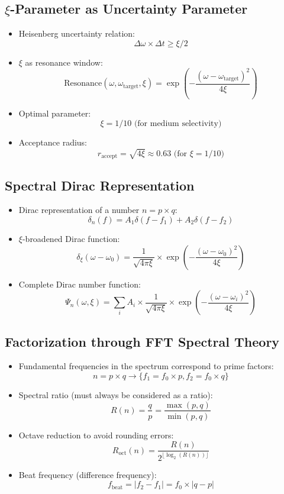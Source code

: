 \documentclass[12pt,a4paper]{article}
\begin{document}
	\subsection{$\xi$-Parameter as Uncertainty Parameter}
	\begin{itemize}
		\item Heisenberg uncertainty relation:
		$$\Delta\omega \times \Delta t \geq \xi/2$$
		
		\item $\xi$ as resonance window:
		$$\text{Resonance}(\omega, \omega_{\text{target}}, \xi) = \exp\left(-\frac{(\omega-\omega_{\text{target}})^2}{4\xi}\right)$$
		
		\item Optimal parameter:
		$$\xi = 1/10 \text{ (for medium selectivity)}$$
		
		\item Acceptance radius:
		$$r_{\text{accept}} = \sqrt{4\xi} \approx 0.63 \text{ (for } \xi = 1/10)$$
	\end{itemize}
	
	\subsection{Spectral Dirac Representation}
	\begin{itemize}
		\item Dirac representation of a number $n = p \times q$:
		$$\delta_n(f) = A_1\delta(f - f_1) + A_2\delta(f - f_2)$$
		
		\item $\xi$-broadened Dirac function:
		$$\delta_\xi(\omega - \omega_0) = \frac{1}{\sqrt{4\pi\xi}} \times \exp\left(-\frac{(\omega-\omega_0)^2}{4\xi}\right)$$
		
		\item Complete Dirac number function:
		$$\Psi_n(\omega,\xi) = \sum_i A_i \times \frac{1}{\sqrt{4\pi\xi}} \times \exp\left(-\frac{(\omega-\omega_i)^2}{4\xi}\right)$$
	\end{itemize}
	
	\subsection{Factorization through FFT Spectral Theory}
	\begin{itemize}
		\item Fundamental frequencies in the spectrum correspond to prime factors:
		$$n = p \times q \rightarrow \{f_1 = f_0 \times p, f_2 = f_0 \times q\}$$
		
		\item Spectral ratio (must always be considered as a ratio):
		$$R(n) = \frac{q}{p} = \frac{\max(p,q)}{\min(p,q)}$$
		
		\item Octave reduction to avoid rounding errors:
		$$R_{\text{oct}}(n) = \frac{R(n)}{2^{\lfloor\log_2(R(n))\rfloor}}$$
		
		\item Beat frequency (difference frequency):
		$$f_{\text{beat}} = |f_2 - f_1| = f_0 \times |q - p|$$
	\end{itemize}
	
\end{document}
